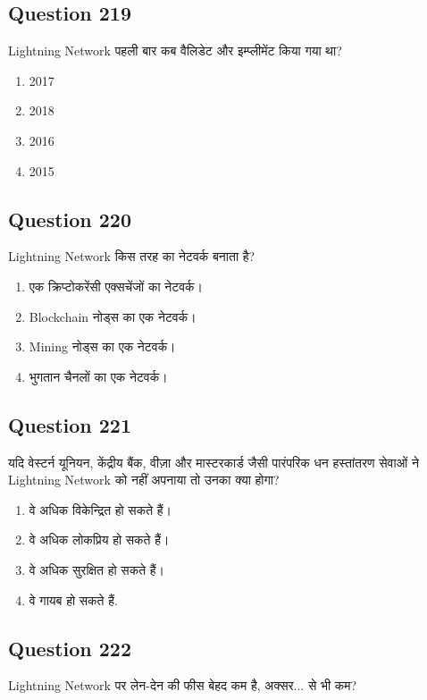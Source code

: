 \documentclass[12pt,a4paper]{article}
\begin{document}
\bigskip


\subsection*{Question 219}
Lightning Network पहली बार कब वैलिडेट और इम्प्लीमेंट किया गया था?

\begin{enumerate}[label=\Alph*., leftmargin=*]
\item 2017
\item 2018
\item 2016
\item 2015
\end{enumerate}

\bigskip


\subsection*{Question 220}
Lightning Network किस तरह का नेटवर्क बनाता है?

\begin{enumerate}[label=\Alph*., leftmargin=*]
\item एक क्रिप्टोकरेंसी एक्सचेंजों का नेटवर्क।
\item Blockchain नोड्स का एक नेटवर्क।
\item Mining नोड्स का एक नेटवर्क।
\item भुगतान चैनलों का एक नेटवर्क।
\end{enumerate}

\bigskip


\subsection*{Question 221}
यदि वेस्टर्न यूनियन, केंद्रीय बैंक, वीज़ा और मास्टरकार्ड जैसी पारंपरिक धन हस्तांतरण सेवाओं ने Lightning Network को नहीं अपनाया तो उनका क्या होगा?

\begin{enumerate}[label=\Alph*., leftmargin=*]
\item वे अधिक विकेन्द्रित हो सकते हैं।
\item वे अधिक लोकप्रिय हो सकते हैं।
\item वे अधिक सुरक्षित हो सकते हैं।
\item वे गायब हो सकते हैं.
\end{enumerate}

\bigskip


\subsection*{Question 222}
Lightning Network पर लेन-देन की फीस बेहद कम है, अक्सर... से भी कम?
\end{document}
